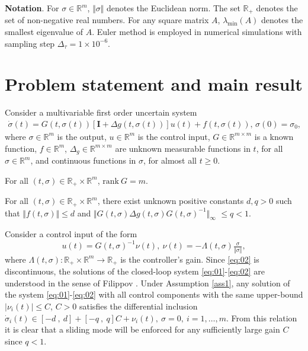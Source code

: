 \documentclass[twocolumn]{autart}    %
\begin{document}
\noindent \textbf{Notation}. For $\sigma\in \mathbb{R}^m$,  $\Vert \sigma \Vert$ denotes the Euclidean norm. The set $\mathbb{R}_+$ denotes the set of non-negative real numbers. For any square matrix $A$, $\lambda_{\mathrm{min}}(A)$ denotes the smallest eigenvalue of $A$.  Euler method is employed in numerical simulations with sampling step $\Delta_\tau=1\times 10^{-6}$.
\section{Problem statement and main result}
\vspace{-1mm}
Consider a multivariable first order uncertain system
\begin{equation}\label{eq:01}
\begin{aligned}
\dot{\sigma}(t)\!=\!G(t,\!\sigma(t))\![\mathbf{I}\!+\!\Delta g(t,\!\sigma(t))]u(t)\!+\! f(t,\!\sigma(t)),\, \sigma(0)\!=\!\sigma_0,
\end{aligned}
\end{equation} where $\sigma\in \mathbb{R}^{m}$ is the output, $u \in \mathbb{R}^m$ is the control input, $G\in \mathbb{R}^{m \times m}$ is a known function, $f\in \mathbb{R}^{m}$, $\Delta_g \in \mathbb{R}^{m \times m}$ are unknown measurable functions in $t$, for all $\sigma\in \mathbb{R}^m$, and continuous functions in $\sigma$, for almost all $t\geq0$.
\begin{assum}\label{ass0}  For all $(t,\sigma)\in \mathbb{R}_{+}\times \mathbb{R}^m$, $\mathrm{rank}\:G=m$.
\end{assum}
\begin{assum}\label{ass1}  For all $(t,\sigma)\in \mathbb{R}_{+}\times \mathbb{R}^m$, there exist unknown positive constants $d,q>0$ such that $\Vert f(t,\sigma) \Vert \leq d $ and $\Vert G(t,\sigma)\Delta g(t,\sigma)G(t,\sigma)^{-1} \Vert_{\infty}$ $\leq q <1$.
\end{assum}
Consider a control input of the form
\begin{equation}\label{eq:02}
u(t)=G(t,\sigma)^{-1}\nu(t),\: \nu(t)=-\Lambda(t,\sigma)\tfrac{\sigma}{\Vert \sigma \Vert},
\end{equation} where $\Lambda(t,\sigma):\mathbb{R}_+\times \mathbb{R}^m\rightarrow\mathbb{R}_+$ is the controller's gain.  Since \eqref{eq:02} is discontinuous, the solutions of the closed-loop system \eqref{eq:01}-\eqref{eq:02} are understood in the sense of Filippov \cite{filippov13}. Under Assumption \ref{ass1}, any solution of the system \eqref{eq:01}-\eqref{eq:02} with all control components with the same upper-bound $\vert \nu_i(t) \vert \leq C$, $C>0$ satisfies the differential inclusion $\dot{\sigma}_i(t)\in [-d\:,\:d]+[-q\:,\: q]C+\nu_i(t),\: \sigma=0,\:i=1,\ldots,m.$ From this relation it is clear that a sliding mode will be enforced for any sufficiently large gain $C$ since $q<1$.
\end{document}

